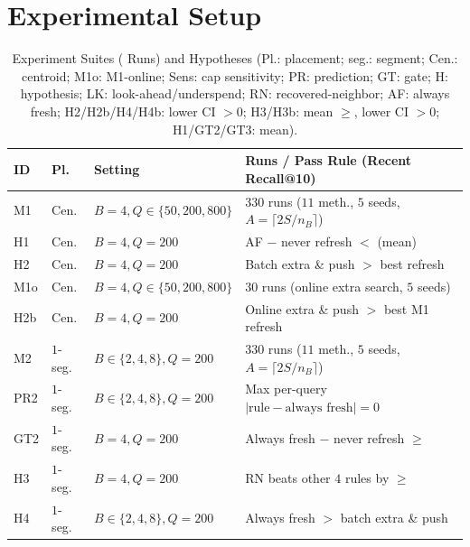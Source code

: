 \section{Experimental Setup}
\label{sec:setup}

\begin{table}[!t]
\centering
\caption{Experiment Suites (\RNumTotalMainRuns{} Runs) and Hypotheses (Pl.: placement; seg.: segment; Cen.: centroid; M1o: M1-online; Sens: cap sensitivity; PR: prediction; GT: gate; H: hypothesis; LK: look-ahead/underspend; RN: recovered-neighbor; AF: always fresh; H2/H2b/H4/H4b: lower \RNumCIPct{} CI $> 0$; H3/H3b: mean $\ge {}$\RNumGateThresholdPP{}, lower CI $> 0$; H1/GT2/GT3: mean).}
\label{tab:exp_matrix}
\scriptsize
\renewcommand{\arraystretch}{0.68}
\setlength{\tabcolsep}{1.0pt}
\begin{tabular}{@{}llll@{}}
\toprule
\textbf{ID} & \textbf{Pl.} & \textbf{Setting} & \textbf{Runs / Pass Rule (Recent Recall@10)} \\
\midrule
M1 & Cen. & $B{=}4, Q{\in}\{50,200,800\}$ & $330$ runs ($11$ meth., $5$ seeds, $A{=}\lceil 2S/n_B\rceil$) \\
\hspace{1mm}H1 & Cen. & $B{=}4, Q{=}200$ & AF $-$ never refresh $< {}$\RNumGateThresholdPP{} (mean) \\
\hspace{1mm}H2 & Cen. & $B{=}4, Q{=}200$ & Batch extra \& push $>$ best refresh \\
M1o & Cen. & $B{=}4, Q{\in}\{50,200,800\}$ & $30$ runs (online extra search, $5$ seeds) \\
\hspace{1mm}H2b & Cen. & $B{=}4, Q{=}200$ & Online extra \& push $>$ best M1 refresh \\
M2 & $1$-seg. & $B{\in}\{2,4,8\}, Q{=}200$ & $330$ runs ($11$ meth., $5$ seeds, $A{=}\lceil 2S/n_B\rceil$) \\
\hspace{1mm}PR2 & $1$-seg. & $B{\in}\{2,4,8\}, Q{=}200$ & Max per-query $|\text{rule} - \text{always fresh}| = 0$ \\
\hspace{1mm}GT2 & $1$-seg. & $B{=}4, Q{=}200$ & Always fresh $-$ never refresh $\ge {}$\RNumGateThresholdPP{} \\
\hspace{1mm}H3 & $1$-seg. & $B{=}4, Q{=}200$ & RN beats other $4$ rules by $\ge {}$\RNumGateThresholdPP{} \\
\hspace{1mm}H4 & $1$-seg. & $B{\in}\{2,4,8\}, Q{=}200$ & Always fresh $>$ batch extra \& push \\

\end{tabular}
\end{table}
